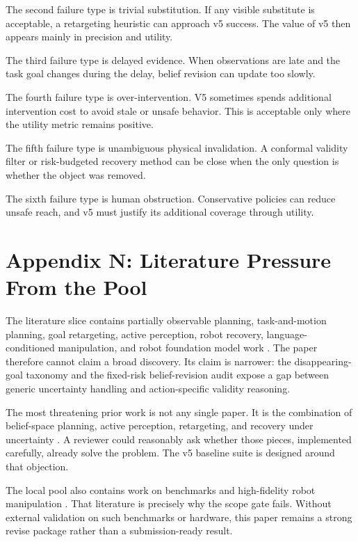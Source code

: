 \documentclass{article}
\begin{document}
The second failure type is trivial substitution. If any visible substitute is acceptable, a retargeting heuristic can approach v5 success. The value of v5 then appears mainly in precision and utility.

The third failure type is delayed evidence. When observations are late and the task goal changes during the delay, belief revision can update too slowly.

The fourth failure type is over-intervention. V5 sometimes spends additional intervention cost to avoid stale or unsafe behavior. This is acceptable only where the utility metric remains positive.

The fifth failure type is unambiguous physical invalidation. A conformal validity filter or risk-budgeted recovery method can be close when the only question is whether the object was removed.

The sixth failure type is human obstruction. Conservative policies can reduce unsafe reach, and v5 must justify its additional coverage through utility.

\section{Appendix N: Literature Pressure From the Pool}
The literature slice contains partially observable planning, task-and-motion planning, goal retargeting, active perception, robot recovery, language-conditioned manipulation, and robot foundation model work \citep{yuan2026roboforge26,potts2023poststroke27,zhang2025dthrl28,sui2015axiomatic29,theocharous2003approximate30,arkin2020multimodal31,krishna2026ghost32,wang2026partially33}. The paper therefore cannot claim a broad discovery. Its claim is narrower: the disappearing-goal taxonomy and the fixed-risk belief-revision audit expose a gap between generic uncertainty handling and action-specific validity reasoning.

The most threatening prior work is not any single paper. It is the combination of belief-space planning, active perception, retargeting, and recovery under uncertainty \citep{openai2021asymmetric34,liu2017learning35,pham2024adaptive36,kalithasan2024learning37,bassily2014intuitive38,guo2026moeact39,jiang2025rethinking40,wang2025chainofmodality41}. A reviewer could reasonably ask whether those pieces, implemented carefully, already solve the problem. The v5 baseline suite is designed around that objection.

The local pool also contains work on benchmarks and high-fidelity robot manipulation \citep{welte2026flowcorrect42,xue2026tube43,alizadeh2014learning44,strazzeri2021topological45,jang2023murm46,kim2022goalconditioned47,niehues2015compliance48,mannucci2024extending49}. That literature is precisely why the scope gate fails. Without external validation on such benchmarks or hardware, this paper remains a strong revise package rather than a submission-ready result.
\end{document}
